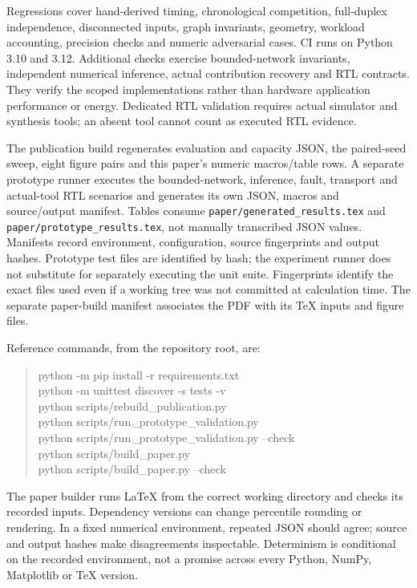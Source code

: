 \documentclass[11pt,a4paper]{article}
\begin{document}
Regressions cover hand-derived timing, chronological competition,
full-duplex independence, disconnected inputs, graph invariants, geometry,
workload accounting, precision checks and numeric adversarial cases. CI runs
on Python 3.10 and 3.12. Additional checks exercise bounded-network invariants,
independent numerical inference, actual contribution recovery and RTL contracts.
They verify the scoped implementations rather than hardware application
performance or energy. Dedicated RTL validation requires actual simulator and
synthesis tools; an absent tool cannot count as executed RTL evidence.

The publication build regenerates evaluation and capacity JSON, the
paired-seed sweep, eight figure pairs and this paper's numeric macros/table
rows. A separate prototype runner executes the bounded-network, inference,
fault, transport and actual-tool RTL scenarios and generates its own JSON,
macros and source/output manifest. Tables consume
\texttt{paper/generated\_results.tex} and
\texttt{paper/prototype\_results.tex}, not manually transcribed JSON values.
Manifests record environment, configuration, source fingerprints and output
hashes. Prototype test files are identified by hash; the experiment runner
does not substitute for separately executing the unit suite. Fingerprints
identify the exact files used even if a working tree was not committed at
calculation time.
The separate paper-build manifest associates the PDF with its TeX inputs and
figure files.

Reference commands, from the repository root, are:
\begin{quote}\small\ttfamily
python -m pip install -r requirements.txt\\
python -m unittest discover -s tests -v\\
python scripts/rebuild\_publication.py\\
python scripts/run\_prototype\_validation.py\\
python scripts/run\_prototype\_validation.py --check\\
python scripts/build\_paper.py\\
python scripts/build\_paper.py --check
\end{quote}
The paper builder runs LaTeX from the correct working directory and checks
its recorded inputs. Dependency versions can change percentile rounding or
rendering. In a fixed numerical environment, repeated JSON should agree;
source and output hashes make disagreements inspectable. Determinism is
conditional on the recorded environment, not a promise across every Python,
NumPy, Matplotlib or TeX version.
\end{document}
